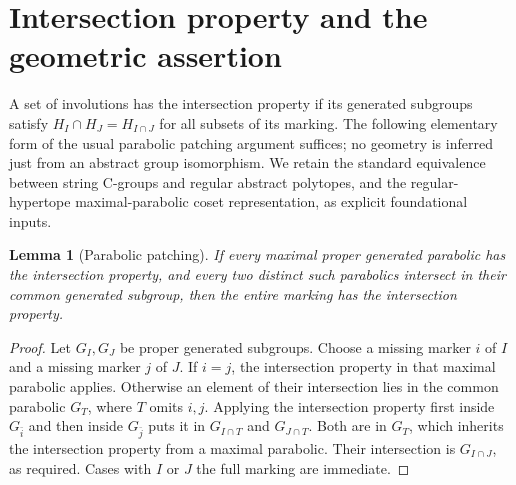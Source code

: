 \documentclass[11pt,a4paper]{article}
\newtheorem{lemma}{Lemma}
\begin{document}
\section{Intersection property and the geometric assertion}
A set of involutions has the intersection property if its generated
subgroups satisfy $H_I\cap H_J=H_{I\cap J}$ for all subsets of its
marking. The following elementary form of the usual parabolic patching
argument suffices; no geometry is inferred just from an abstract group
isomorphism. We retain the standard equivalence between string C-groups
and regular abstract polytopes, and the regular-hypertope
maximal-parabolic coset representation, as explicit foundational inputs.

\begin{lemma}[Parabolic patching]\label{patch}
If every maximal proper generated parabolic has the intersection property,
and every two distinct such parabolics intersect in their common generated
subgroup, then the entire marking has the intersection property.
\end{lemma}
\begin{proof}
Let $G_I,G_J$ be proper generated subgroups. Choose a missing marker $i$
of $I$ and a missing marker $j$ of $J$. If $i=j$, the intersection property
in that maximal parabolic applies. Otherwise an element of their
intersection lies in the common parabolic $G_T$, where $T$ omits $i,j$.
Applying the intersection property first inside $G_{\bar i}$ and then
inside $G_{\bar j}$ puts it in $G_{I\cap T}$ and $G_{J\cap T}$.
Both are in $G_T$, which inherits the intersection property from a maximal
parabolic. Their intersection is $G_{I\cap J}$, as required. Cases with
$I$ or $J$ the full marking are immediate.
\end{proof}
\end{document}
